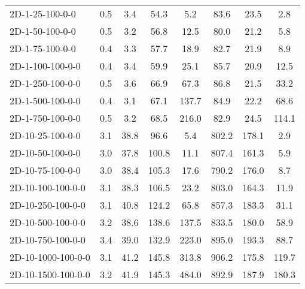 \documentclass{article}
\begin{document}
\begin{table}[h]
\begin{center}
\begin{tabular}{|l||c|c|c|c|c|c|c|}
            \hline
            2D-1-25-100-0-0                & 0.5  & 3.4       & 54.3       & 5.2         & 83.6     & 23.5      & 2.8        \\
            2D-1-50-100-0-0                & 0.5  & 3.2       & 56.8       & 12.5        & 80.0     & 21.2      & 5.8        \\
            2D-1-75-100-0-0                & 0.4  & 3.3       & 57.7       & 18.9        & 82.7     & 21.9      & 8.9        \\
            2D-1-100-100-0-0               & 0.4  & 3.4       & 59.9       & 25.1        & 85.7     & 20.9      & 12.5       \\
            2D-1-250-100-0-0               & 0.5  & 3.6       & 66.9       & 67.3        & 86.8     & 21.5      & 33.2       \\
            2D-1-500-100-0-0               & 0.4  & 3.1       & 67.1       & 137.7       & 84.9     & 22.2      & 68.6       \\
            2D-1-750-100-0-0               & 0.5  & 3.2       & 68.5       & 216.0       & 82.9     & 24.5      & 114.1      \\
            \hline
            2D-10-25-100-0-0               & 3.1  & 38.8      & 96.6       & 5.4         & 802.2    & 178.1     & 2.9        \\
            2D-10-50-100-0-0               & 3.0  & 37.8      & 100.8      & 11.1        & 807.4    & 161.3     & 5.9        \\
            2D-10-75-100-0-0               & 3.0  & 38.4      & 105.3      & 17.6        & 790.2    & 176.0     & 8.7        \\
            2D-10-100-100-0-0              & 3.1  & 38.3      & 106.5      & 23.2        & 803.0    & 164.3     & 11.9       \\
            2D-10-250-100-0-0              & 3.1  & 40.8      & 124.2      & 65.8        & 857.3    & 183.3     & 31.1       \\
            2D-10-500-100-0-0              & 3.2  & 38.6      & 138.6      & 137.5       & 833.5    & 180.0     & 58.9       \\
            2D-10-750-100-0-0              & 3.4  & 39.0      & 132.9      & 223.0       & 895.0    & 193.3     & 88.7       \\
            2D-10-1000-100-0-0             & 3.1  & 41.2      & 145.8      & 313.8       & 906.2    & 175.8     & 119.7      \\
            2D-10-1500-100-0-0             & 3.2  & 41.9      & 145.3      & 484.0       & 892.9    & 187.9     & 180.3      \\

\end{tabular}
\end{center}
\end{table}
\end{document}
